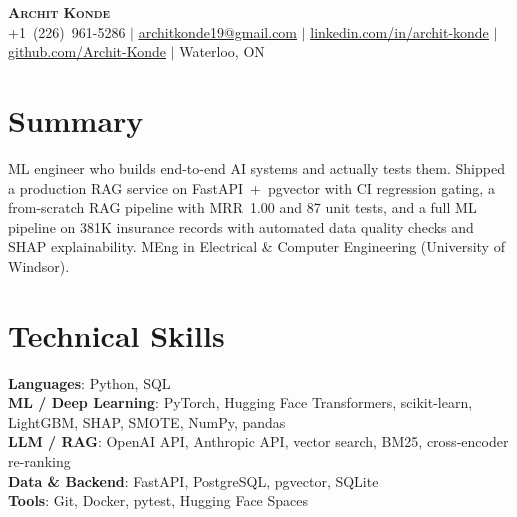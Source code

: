 \documentclass[letterpaper,11pt]{article}
\begin{document}
\begin{center}
    \textbf{\Huge \scshape Archit Konde} \\ \vspace{1pt}
    \small +1~(226)~961-5286 $|$
    \href{mailto:architkonde19@gmail.com}{\underline{architkonde19@gmail.com}} $|$
    \href{https://linkedin.com/in/archit-konde}{\underline{linkedin.com/in/archit-konde}} $|$
    \href{https://github.com/Archit-Konde}{\underline{github.com/Archit-Konde}} $|$
    Waterloo, ON
\end{center}
\section{Summary}
\small{ML engineer who builds end-to-end AI systems and actually tests
them. Shipped a production RAG service on FastAPI~+~pgvector with CI
regression gating, a from-scratch RAG pipeline with MRR~1.00 and 87
unit tests, and a full ML pipeline on 381K insurance records with
automated data quality checks and SHAP explainability. MEng in
Electrical \& Computer Engineering (University of Windsor).}
\section{Technical Skills}
 \begin{itemize}[leftmargin=0.15in, label={}]
    \small{\item{
     \textbf{Languages}{: Python, SQL} \\
     \textbf{ML / Deep Learning}{: PyTorch, Hugging Face Transformers, scikit-learn, LightGBM, SHAP, SMOTE, NumPy, pandas} \\
     \textbf{LLM / RAG}{: OpenAI API, Anthropic API, vector search, BM25, cross-encoder re-ranking} \\
     \textbf{Data \& Backend}{: FastAPI, PostgreSQL, pgvector, SQLite} \\
     \textbf{Tools}{: Git, Docker, pytest, Hugging Face Spaces}
    }}
 \end{itemize}
\end{document}
